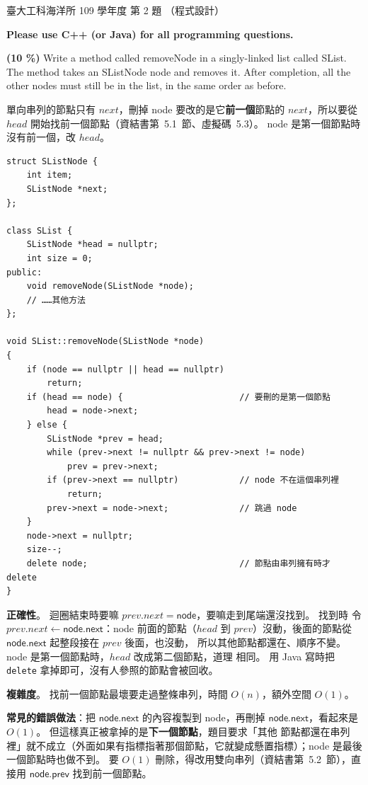 \begin{pastexam}[label={px:ntu-109-esoe-ds-02}]{臺大工科海洋所 109 學年度 第 2 題}
（程式設計）

\textbf{Please use C++ (or Java) for all programming questions.}

\textbf{(10 \%)} Write a method called \textsf{removeNode} in a singly-linked list called
\textsf{SList}. The method takes an \textsf{SListNode} node and removes it. After completion, all
the other nodes must still be in the list, in the same order as before.
\end{pastexam}

\begin{pastsoln}
單向串列的節點只有 $\mathit{next}$，刪掉 \textsf{node} 要改的是它\textbf{前一個}節點的
$\mathit{next}$，所以要從 $\mathit{head}$ 開始找前一個節點（資結書第~5.1~節、虛擬碼~5.3）。
\textsf{node} 是第一個節點時沒有前一個，改 $\mathit{head}$。

\begin{verbatim}
struct SListNode {
    int item;
    SListNode *next;
};

class SList {
    SListNode *head = nullptr;
    int size = 0;
public:
    void removeNode(SListNode *node);
    // ……其他方法
};

void SList::removeNode(SListNode *node)
{
    if (node == nullptr || head == nullptr)
        return;
    if (head == node) {                       // 要刪的是第一個節點
        head = node->next;
    } else {
        SListNode *prev = head;
        while (prev->next != nullptr && prev->next != node)
            prev = prev->next;
        if (prev->next == nullptr)            // node 不在這個串列裡
            return;
        prev->next = node->next;              // 跳過 node
    }
    node->next = nullptr;
    size--;
    delete node;                              // 節點由串列擁有時才 delete
}
\end{verbatim}

\textbf{正確性}。 迴圈結束時要嘛 $\mathit{prev.next} = \textsf{node}$，要嘛走到尾端還沒找到。 找到時
令 $\mathit{prev.next} \gets \textsf{node.next}$：\textsf{node} 前面的節點（$\mathit{head}$ 到
$\mathit{prev}$）沒動，後面的節點從 $\textsf{node.next}$ 起整段接在 $\mathit{prev}$ 後面，也沒動，
所以其他節點都還在、順序不變。 \textsf{node} 是第一個節點時，$\mathit{head}$ 改成第二個節點，道理
相同。 用 Java 寫時把 \texttt{delete} 拿掉即可，沒有人參照的節點會被回收。

\textbf{複雜度}。 找前一個節點最壞要走過整條串列，時間 $O(n)$，額外空間 $O(1)$。

\textbf{常見的錯誤做法}：把 $\textsf{node.next}$ 的內容複製到 \textsf{node}，再刪掉
$\textsf{node.next}$，看起來是 $O(1)$。 但這樣真正被拿掉的是\textbf{下一個節點}，題目要求「其他
節點都還在串列裡」就不成立（外面如果有指標指著那個節點，它就變成懸置指標）；\textsf{node} 是最後
一個節點時也做不到。 要 $O(1)$ 刪除，得改用雙向串列（資結書第~5.2~節），直接用
$\textsf{node.prev}$ 找到前一個節點。
\end{pastsoln}
